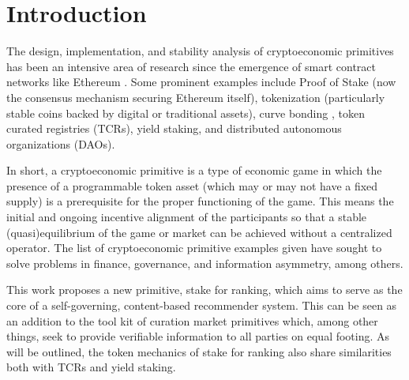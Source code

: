 \section{Introduction}

The design, implementation, and stability analysis of cryptoeconomic primitives \cite{horne2018crypto} has been an intensive area of research since the emergence of smart contract networks like Ethereum \cite{buterin2014next}. Some prominent examples include Proof of Stake \cite{quantum2011bitcoin} (now the consensus mechanism securing Ethereum itself), tokenization (particularly stable coins backed by digital or traditional assets), curve bonding \cite{graphBondingCurve}, token curated registries \cite{Goldin2018TCR} (TCRs), yield staking, and distributed autonomous organizations \cite{merkle2016daos} (DAOs). 

In short, a cryptoeconomic primitive is a type of economic game in which the presence of a programmable token asset (which may or may not have a fixed supply) is a prerequisite for the proper functioning of the game. This means the initial and ongoing incentive alignment of the participants so that a stable (quasi)equilibrium of the game or market can be achieved without a centralized operator. The list of cryptoeconomic primitive examples given have sought to solve problems in finance, governance, and information asymmetry, among others. 

This work proposes a new primitive, stake for ranking, which aims to serve as the core of a self-governing, content-based recommender system. This can be seen as an addition to the tool kit of curation market primitives which, among other things, seek to provide verifiable information to all parties on equal footing. As will be outlined, the token mechanics of stake for ranking also share similarities both with TCRs and yield staking. 